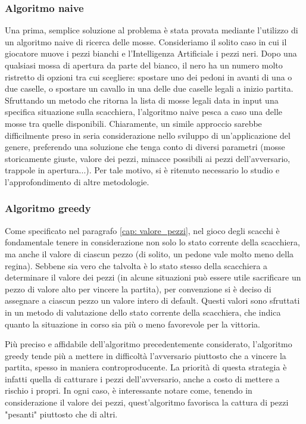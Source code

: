 \subsubsection{Algoritmo naive}
Una prima, semplice soluzione al problema è stata provata mediante l'utilizzo di un algoritmo naive di ricerca delle mosse. Consideriamo il solito caso in cui il giocatore muove i pezzi bianchi e l'Intelligenza Artificiale i pezzi neri. Dopo una qualsiasi mossa di apertura da parte del bianco, il nero ha un numero molto ristretto di opzioni tra cui scegliere: spostare uno dei pedoni in avanti di una o due caselle, o spostare un cavallo in una delle due caselle legali a inizio partita. Sfruttando un metodo che ritorna la lista di mosse legali data in input una specifica situazione sulla scacchiera, l'algoritmo naive pesca a caso una delle mosse tra quelle disponibili. Chiaramente, un simile approccio sarebbe difficilmente preso in seria considerazione nello sviluppo di un'applicazione del genere, preferendo una soluzione che tenga conto di diversi parametri (mosse storicamente giuste, valore dei pezzi, minacce possibili ai pezzi dell'avversario, trappole in apertura...). Per tale motivo, si è ritenuto necessario lo studio e l'approfondimento di altre metodologie. 

\subsubsection{Algoritmo greedy}
Come specificato nel paragrafo \ref{cap: valore_pezzi}, nel gioco degli scacchi è fondamentale tenere in considerazione non solo lo stato corrente della scacchiera, ma anche il valore di ciascun pezzo (di solito, un pedone vale molto meno della regina). Sebbene sia vero che talvolta è lo stato stesso della scacchiera a determinare il valore dei pezzi (in alcune situazioni può essere utile sacrificare un pezzo di valore alto per vincere la partita), per convenzione si è deciso di assegnare a ciascun pezzo un valore intero di default. Questi valori sono sfruttati in un metodo di valutazione dello stato corrente della scacchiera, che indica quanto la situazione in corso sia più o meno favorevole per la vittoria.

Più preciso e affidabile dell'algoritmo precedentemente considerato, l'algoritmo greedy tende più a mettere in difficoltà l'avversario piuttosto che a vincere la partita, spesso in maniera controproducente. La priorità di questa strategia è infatti quella di catturare i pezzi dell'avversario, anche a costo di mettere a rischio i propri. In ogni caso, è interessante notare come, tenendo in considerazione il valore dei pezzi, quest'algoritmo favorisca la cattura di pezzi "pesanti" piuttosto che di altri. 
